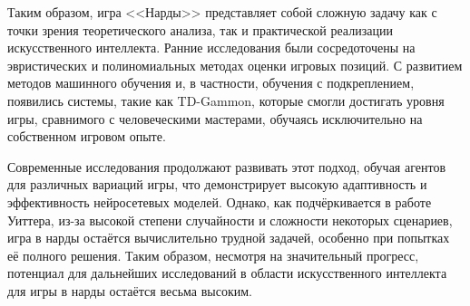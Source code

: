 Таким образом, игра <<Нарды>> представляет собой сложную задачу как с точки зрения теоретического анализа, так и практической реализации искусственного интеллекта. Ранние исследования были сосредоточены на эвристических и полиномиальных методах оценки игровых позиций. С развитием методов машинного обучения и, в частности, обучения с подкреплением, появились системы, такие как TD-Gammon, которые смогли достигать уровня игры, сравнимого с человеческими мастерами, обучаясь исключительно на собственном игровом опыте.

Современные исследования продолжают развивать этот подход, обучая агентов для различных вариаций игры, что демонстрирует высокую адаптивность и эффективность нейросетевых моделей. Однако, как подчёркивается в работе Уиттера, из-за высокой степени случайности и сложности некоторых сценариев, игра в нарды остаётся вычислительно трудной задачей, особенно при попытках её полного решения. Таким образом, несмотря на значительный прогресс, потенциал для дальнейших исследований в области искусственного интеллекта для игры в нарды остаётся весьма высоким.
